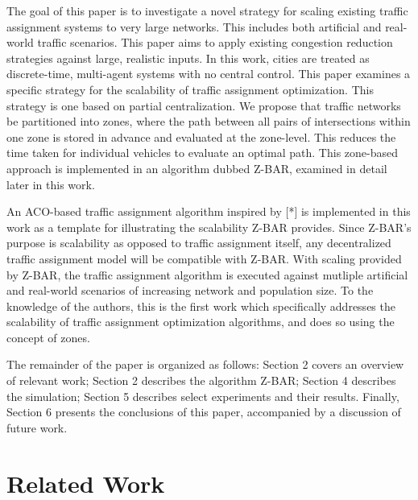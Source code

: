 \documentclass[conference]{IEEEtran}
\begin{document}
The goal of this paper is to investigate a novel strategy for scaling existing traffic assignment systems to very large networks. This includes both artificial and real-world traffic scenarios. This paper aims to apply existing congestion reduction strategies against large, realistic inputs. In this work, cities are treated as discrete-time, multi-agent systems with no central control. This paper examines a specific strategy for the scalability of traffic assignment optimization. This strategy is one based on partial centralization. We propose that traffic networks be partitioned into zones, where the path between all pairs of intersections within one zone is stored in advance and evaluated at the zone-level. This reduces the time taken for individual vehicles to evaluate an optimal path. This zone-based approach is implemented in an algorithm dubbed Z-BAR, examined in detail later in this work.

An ACO-based traffic assignment algorithm inspired by [*] is implemented in this work as a template for illustrating the scalability Z-BAR provides. Since Z-BAR's purpose is scalability as opposed to traffic assignment itself, any decentralized traffic assignment model will be compatible with Z-BAR. With scaling provided by Z-BAR, the traffic assignment algorithm is executed against mutliple artificial and real-world scenarios of increasing network and population size. To the knowledge of the authors, this is the first work which specifically addresses the scalability of traffic assignment optimization algorithms, and does so using the concept of zones.

The remainder of the paper is organized as follows: Section 2 covers an overview of relevant work; Section 2 describes the algorithm Z-BAR; Section 4 describes the simulation; Section 5 describes select experiments and their results. Finally, Section 6 presents the conclusions of this paper, accompanied by a discussion of future work.


\section{Related Work} %
\end{document}

